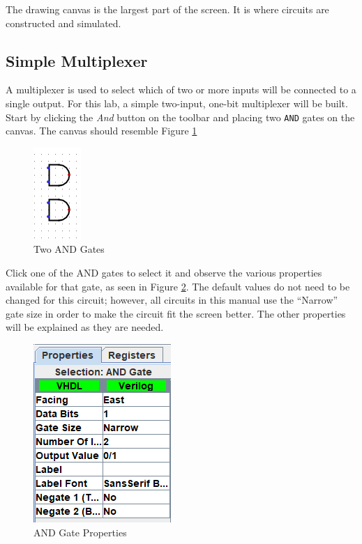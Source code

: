 The drawing canvas is the largest part of the screen. It is where circuits are constructed and simulated. 

\subsection{Simple Multiplexer}

A multiplexer is used to select which of two or more inputs will be connected to a single output. For this lab, a simple two-input, one-bit multiplexer will be built. Start by clicking the \textit{And} button on the toolbar and placing two \texttt{AND} gates on the canvas. The canvas should resemble Figure \ref{fig:01-02}

\begin{figure}[H]
	\centering
	\includegraphics[width=\maxwidth{.95\linewidth}]{gfx/01-02}
	\caption{Two AND Gates}
	\label{fig:01-02}
\end{figure}

Click one of the AND gates to select it and observe the various properties available for that gate, as seen in Figure \ref{fig:01-03}. The default values do not need to be changed for this circuit; however, all circuits in this manual use the ``Narrow'' gate size in order to make the circuit fit the screen better. The other properties will be explained as they are needed.

\begin{figure}[H]
	\centering
	\includegraphics[width=\maxwidth{.95\linewidth}]{gfx/01-03}
	\caption{AND Gate Properties}
	\label{fig:01-03}
\end{figure}

